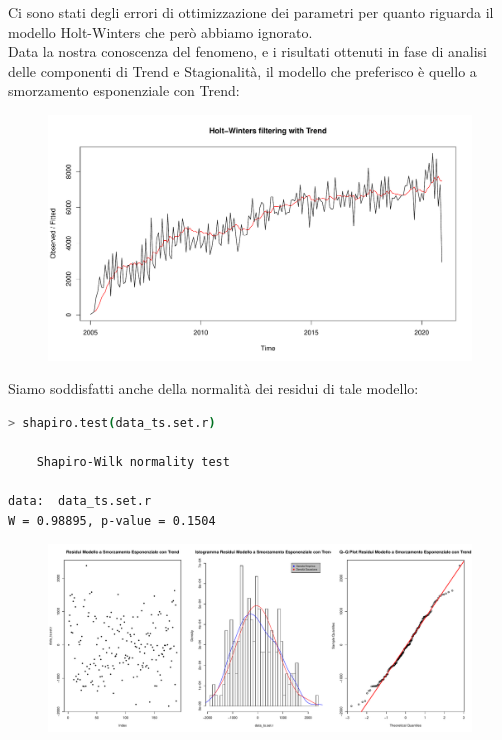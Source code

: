 \documentclass[11pt,a4paper]{article}
\begin{document}
\noindent
Ci sono stati degli errori di ottimizzazione dei parametri per quanto riguarda
il modello Holt-Winters che per\`o abbiamo ignorato.\\
Data la nostra conoscenza del fenomeno, e i risultati ottenuti in fase di
analisi delle componenti di Trend e Stagionalit\`a, il modello che preferisco
\`e quello a smorzamento esponenziale con Trend:
\begin{figure}[H]
	\vspace{-0.4cm}
	\hspace{-1.5cm}
	\includegraphics[scale=0.65]{imgs/HW_trend.pdf}
	\vspace{-1.0cm}
\end{figure}
\noindent
Siamo soddisfatti anche della normalit\`a dei residui di tale modello:
\begin{lstlisting}[language=bash,basicstyle=\scriptsize,tabsize=2,frame = single]
> shapiro.test(data_ts.set.r)

	Shapiro-Wilk normality test

data:  data_ts.set.r
W = 0.98895, p-value = 0.1504
\end{lstlisting}
\begin{figure}[H]
	\vspace{-1.5cm}
	\hspace{-2.7cm}
	\includegraphics[scale=0.57]{imgs/HW_residuals_normality.pdf}
\end{figure}
\end{document}
